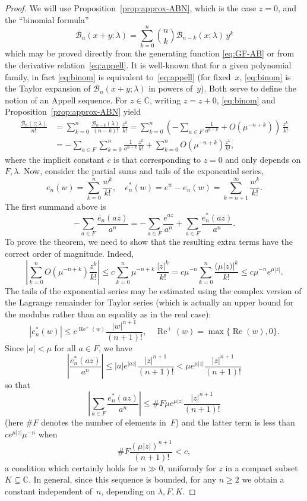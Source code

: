 \documentclass[11pt,a4paper]{amsart}
\newcommand{\C}{\mathbb{C}}
\newcommand{\B}{\mathcal{B}}
\renewcommand{\Re}{\operatorname{Re}}
\theoremstyle{plain}
\theoremstyle{remark}
\begin{document}
\begin{proof}
We will use Proposition~\ref{prop:approx-ABN}, which is the case $z=0$, and the ``binomial formula''
%
\begin{equation}
\label{eq:binom}
	\B_{n}(x+y;\lambda) = \sum_{k=0}^{n} \binom{n}{k} \B_{n-k}(x;\lambda) \, y^{k}
\end{equation}
%
which may be proved directly from the generating function \eqref{eq:GF-AB} or from the derivative relation~\eqref{eq:appell}. It is well-known that for a given polynomial family, in fact \eqref{eq:binom} is equivalent to~\eqref{eq:appell}
(for fixed~$x$, \eqref{eq:binom} is the Taylor expansion of $\B_{n}(x+y;\lambda)$ in powers of~$y$).
Both serve to define the notion of an Appell sequence. For $z \in \C$, writing $z = z + 0$, \eqref{eq:binom} and Proposition~\ref{prop:approx-ABN} yield
$$
\begin{aligned}
	   \frac{\B_{n}(z;\lambda)}{n!}
	&= \sum_{k=0}^{n} \frac{\B_{n-k}(\lambda)}{(n-k)!} \, \frac{z^{k}}{k!}
	 = \sum_{k=0}^{n} \left(- \sum_{a \in F} \frac{1}{a^{n-k}} + O(\mu^{-n+k})\right) 
	   \, \frac{z^{k}}{k!}
	\\
	&= - \sum_{a \in F} \sum_{k=0}^{n} \frac{1}{a^{n-k}} \frac{z^{k}}{k!}
	   + \sum_{k=0}^{n} O(\mu^{-n+k}) \frac{z^{k}}{k!},
\end{aligned}
$$
where the implicit constant $c$ is that corresponding to $z = 0$ and only depends on $F,\lambda$.
Now, consider the partial sums and tails of the exponential series,
$$
	e_{n}(w) = \sum_{k=0}^{n} \frac{w^{k}}{k!},
	\quad
	e_{n}^{*}(w) = e^{w} - e_{n}(w) = \sum_{k=n+1}^{\infty} \frac{w^{k}}{k!}.
$$
The first summand above is
$$
	  - \sum_{a \in F} \frac{e_{n}(az)}{a^{n}}
	= - \sum_{a \in F} \frac{e^{az}}{a^{n}} + \sum_{a \in F} \frac{e_{n}^{*}(az)}{a^{n}}.
$$
To prove the theorem, we need to show that the resulting extra terms have the correct order of magnitude. Indeed, 
$$
	     \left|\sum_{k=0}^{n} O(\mu^{-n+k}) \frac{z^{k}}{k!}\right|
	\leq c \sum_{k=0}^{n} \mu^{-n+k} \, \frac{|z|^{k}}{k!}
	=    c \mu^{-n} \sum_{k=0}^{n} \frac{(\mu|z)|^{k}}{k!}
	\leq c \mu^{-n} e^{\mu|z|}.
$$
The tails of the exponential series may be estimated using the complex version of the Lagrange remainder for Taylor series (which is actually an upper bound for the modulus rather than an equality as in the real case):
$$
	|e_{n}^{*}(w)| \leq e^{\Re^{+}(w)} \frac{|w|^{n+1}}{(n+1)!},
	\quad
	\Re^{+}(w) = \max\{\Re(w), 0\}.
$$
Since $|a| < \mu$ for all $a \in F$, we have
$$
	     \left|\frac{e_{n}^{*}(az)}{a^{n}}\right|
	\leq |a| e^{|az|}\frac{|z|^{n+1}}{(n+1)!}  
	<    \mu e^{\mu |z|} \frac{|z|^{n+1}}{(n+1)!}  
$$
so that 
$$
	     \left|\sum_{a \in F} \frac{e_{n}^{*}(az)}{a^{n}}\right|
	\leq \#F \mu e^{\mu |z|} \frac{|z|^{n+1}}{(n+1)!}
$$
(here $\#F$ denotes the number of elements in~$F$)
and the latter term is less than $c e^{\mu |z|} \mu^{-n}$ when
$$
	\#F \frac{(\mu |z|)^{n+1}}{(n+1)!} < c,
$$
a condition which certainly holds for $n \gg 0$, uniformly for $z$ in a compact subset 
$K \subseteq \C$. In general, since this sequence is bounded, for any $n \geq 2$ we obtain a constant independent of~$n$, depending on $\lambda,F,K$.
\end{proof}
\end{document}
